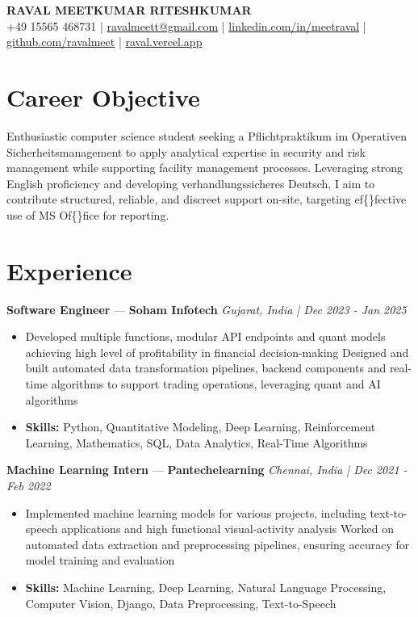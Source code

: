 \documentclass[a4paper,10pt]{article}
\begin{document}
\begin{center}
  {\Large\bfseries RAVAL MEETKUMAR RITESHKUMAR}\\[2pt]
  {\small +49 15565 468731 \;|\; \href{mailto:ravalmeett@gmail.com}{ravalmeett@gmail.com} \;|\; \href{https://www.linkedin.com/in/meetraval/}{linkedin.com/in/meetraval} \;|\; \href{https://github.com/ravalmeet}{github.com/ravalmeet} \;|\; \href{https://raval.vercel.app/}{raval.vercel.app}}
\end{center}
\vspace{-3pt}

\section*{Career Objective}
Enthusiastic computer science student seeking a Pflichtpraktikum im Operativen Sicherheitsmanagement to apply analytical expertise in security and risk management while supporting facility management processes. Leveraging strong English proficiency and developing verhandlungssicheres Deutsch, I aim to contribute structured, reliable, and discreet support on-site, targeting ef\{\}fective use of MS Of\{\}fice for reporting.\par

\section*{Experience}
\textbf{Software Engineer} — \textbf{Soham Infotech} \hfill \textit{Gujarat, India \;|\; Dec 2023 - Jan 2025}\par
\vspace{1pt}
\begin{itemize}
  \item Developed multiple functions, modular API endpoints and quant models achieving high level of profitability in financial decision-making Designed and built automated data transformation pipelines, backend components and real-time algorithms to support trading operations, leveraging quant and AI algorithms
  \item \textbf{Skills:} Python, Quantitative Modeling, Deep Learning, Reinforcement Learning, Mathematics, SQL, Data Analytics, Real-Time Algorithms
\end{itemize}
\vspace{3pt}
\textbf{Machine Learning Intern} — \textbf{Pantechelearning} \hfill \textit{Chennai, India \;|\; Dec 2021 - Feb 2022}\par
\vspace{1pt}
\begin{itemize}
  \item Implemented machine learning models for various projects, including text-to-speech applications and high functional visual-activity analysis Worked on automated data extraction and preprocessing pipelines, ensuring accuracy for model training and evaluation
  \item \textbf{Skills:} Machine Learning, Deep Learning, Natural Language Processing, Computer Vision, Django, Data Preprocessing, Text-to-Speech
\end{itemize}
\end{document}
